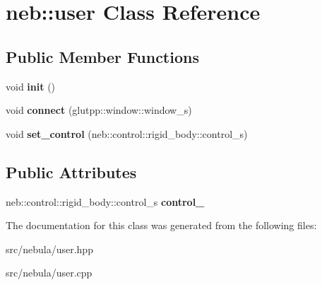 \hypertarget{classneb_1_1user}{\section{neb\-:\-:user \-Class \-Reference}
\label{classneb_1_1user}
}
\subsection*{\-Public \-Member \-Functions}
\begin{DoxyCompactItemize}
\item 
\hypertarget{classneb_1_1user_a03537b4a3dbb21efa368fcf846384dd5}{void {\bfseries init} ()}\label{classneb_1_1user_a03537b4a3dbb21efa368fcf846384dd5}

\item 
\hypertarget{classneb_1_1user_a4bbd0003c3ba2ef7f25579784cbcb6f5}{void {\bfseries connect} (glutpp\-::window\-::window\-\_\-s)}\label{classneb_1_1user_a4bbd0003c3ba2ef7f25579784cbcb6f5}

\item 
\hypertarget{classneb_1_1user_ae6295dcc8ac8e664cedc8591c28257d0}{void {\bfseries set\-\_\-control} (neb\-::control\-::rigid\-\_\-body\-::control\-\_\-s)}\label{classneb_1_1user_ae6295dcc8ac8e664cedc8591c28257d0}

\end{DoxyCompactItemize}
\subsection*{\-Public \-Attributes}
\begin{DoxyCompactItemize}
\item 
\hypertarget{classneb_1_1user_a66992175b55bcc61803d87d19f1327f8}{neb\-::control\-::rigid\-\_\-body\-::control\-\_\-s {\bfseries control\-\_\-}}\label{classneb_1_1user_a66992175b55bcc61803d87d19f1327f8}

\end{DoxyCompactItemize}


\-The documentation for this class was generated from the following files\-:\begin{DoxyCompactItemize}
\item 
src/nebula/user.\-hpp\item 
src/nebula/user.\-cpp\end{DoxyCompactItemize}
